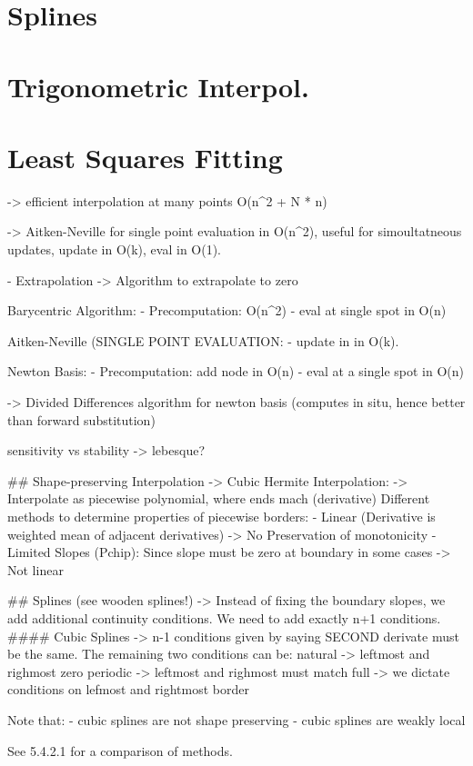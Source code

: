 \section{Splines}
\section{Trigonometric Interpol.}
\section{Least Squares Fitting}


-> efficient interpolation at many points O(n^2 + N * n)

-> Aitken-Neville for single point evaluation in O(n^2), 
	useful for simoultatneous updates, update in O(k), eval in O(1).
	
- Extrapolation 
-> Algorithm to extrapolate to zero

Barycentric Algorithm:
- Precomputation: O(n^2)
- eval at single spot in O(n)

Aitken-Neville (SINGLE POINT EVALUATION:
- update in in O(k).

Newton Basis: 
- Precomputation: add node in O(n)
- eval at a single spot in O(n)

-> Divided Differences algorithm for newton basis (computes in situ, hence better than forward substitution)

 sensitivity vs stability
 -> lebesque?
 
 ## Shape-preserving Interpolation -> Cubic Hermite Interpolation:
 -> Interpolate as piecewise polynomial, where ends mach (derivative)
 Different methods to determine properties of piecewise borders:
 	- Linear (Derivative is weighted mean of adjacent derivatives) -> No Preservation of monotonicity
 	- Limited Slopes (Pchip): Since slope must be zero at boundary in some cases -> Not linear
 	
 ## Splines (see wooden splines!)
 -> Instead of fixing the boundary slopes, we add additional continuity conditions. We need to add exactly n+1 conditions.
 #### Cubic Splines
 -> n-1 conditions given by saying SECOND derivate must be the same.
 The remaining two conditions can be:
	natural -> leftmost and righmost zero
	periodic -> leftmost and righmost must match
	full -> we dictate conditions on lefmost and rightmost border
	
Note that:
	- cubic splines are not shape preserving
	- cubic splines are weakly local
	
	
See 5.4.2.1 for a comparison of methods.

